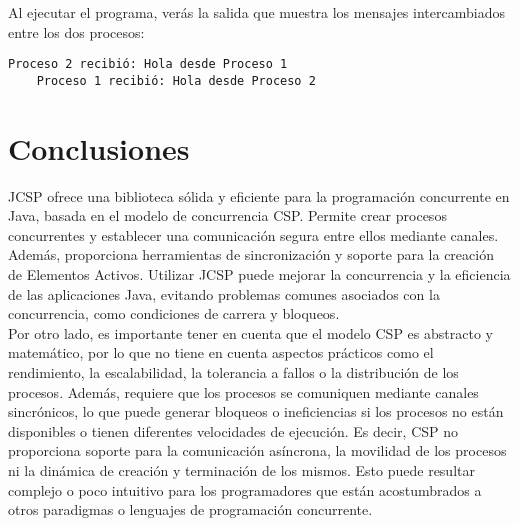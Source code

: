 \noindent Al ejecutar el programa, verás la salida que muestra los mensajes intercambiados entre los dos procesos:

\begin{lstlisting}[frame=single, caption={Salida en termianl}]
	Proceso 2 recibió: Hola desde Proceso 1
	Proceso 1 recibió: Hola desde Proceso 2
\end{lstlisting}
\section*{Conclusiones}
JCSP ofrece una biblioteca sólida y eficiente para la programación concurrente en Java, basada en el modelo de concurrencia CSP. Permite crear procesos concurrentes y establecer una comunicación segura entre ellos mediante canales. Además, proporciona herramientas de sincronización y soporte para la creación de Elementos Activos. Utilizar JCSP puede mejorar la concurrencia y la eficiencia de las aplicaciones Java, evitando problemas comunes asociados con la concurrencia, como condiciones de carrera y bloqueos.\\
Por otro lado, es importante tener en cuenta que el modelo CSP es abstracto y matemático, por lo que no tiene en cuenta aspectos prácticos como el rendimiento, la escalabilidad, la tolerancia a fallos o la distribución de los procesos. Además, requiere que los procesos se comuniquen mediante canales sincrónicos, lo que puede generar bloqueos o ineficiencias si los procesos no están disponibles o tienen diferentes velocidades de ejecución. Es decir, CSP no proporciona soporte para la comunicación asíncrona, la movilidad de los procesos ni la dinámica de creación y terminación de los mismos. Esto puede resultar complejo o poco intuitivo para los programadores que están acostumbrados a otros paradigmas o lenguajes de programación concurrente.